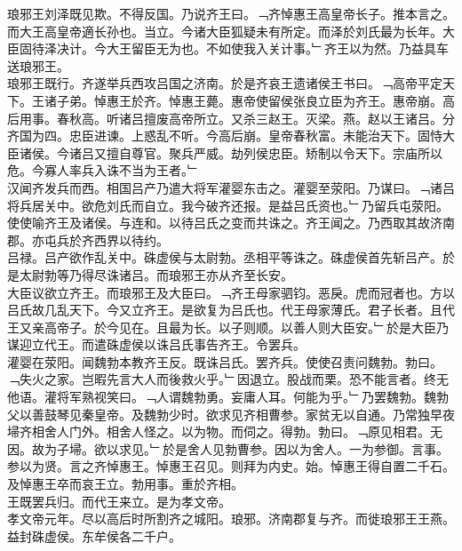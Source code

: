 \documentclass{zhvt-classic}
\begin{document}
\hspace*{2em}琅邪王刘泽既见欺。不得反国。乃说齐王曰。﹁齐悼惠王高皇帝长子。推本言之。而大王高皇帝適长孙也。当立。今诸大臣狐疑未有所定。而泽於刘氏最为长年。大臣固待泽决计。今大王留臣无为也。不如使我入关计事。﹂齐王以为然。乃益具车送琅邪王。\\
\hspace*{2em}琅邪王既行。齐遂举兵西攻吕国之济南。於是齐哀王遗诸侯王书曰。﹁高帝平定天下。王诸子弟。悼惠王於齐。悼惠王薨。惠帝使留侯张良立臣为齐王。惠帝崩。高后用事。春秋高。听诸吕擅废高帝所立。又杀三赵王。灭梁。燕。赵以王诸吕。分齐国为四。忠臣进谏。上惑乱不听。今高后崩。皇帝春秋富。未能治天下。固恃大臣诸侯。今诸吕又擅自尊官。聚兵严威。劫列侯忠臣。矫制以令天下。宗庙所以危。今寡人率兵入诛不当为王者。﹂\\
\hspace*{2em}汉闻齐发兵而西。相国吕产乃遣大将军灌婴东击之。灌婴至荥阳。乃谋曰。﹁诸吕将兵居关中。欲危刘氏而自立。我今破齐还报。是益吕氏资也。﹂乃留兵屯荥阳。使使喻齐王及诸侯。与连和。以待吕氏之变而共诛之。齐王闻之。乃西取其故济南郡。亦屯兵於齐西界以待约。\\
\hspace*{2em}吕禄。吕产欲作乱关中。硃虚侯与太尉勃。丞相平等诛之。硃虚侯首先斩吕产。於是太尉勃等乃得尽诛诸吕。而琅邪王亦从齐至长安。\\
\hspace*{2em}大臣议欲立齐王。而琅邪王及大臣曰。﹁齐王母家驷钧。恶戾。虎而冠者也。方以吕氏故几乱天下。今又立齐王。是欲复为吕氏也。代王母家薄氏。君子长者。且代王又亲高帝子。於今见在。且最为长。以子则顺。以善人则大臣安。﹂於是大臣乃谋迎立代王。而遣硃虚侯以诛吕氏事告齐王。令罢兵。\\
\hspace*{2em}灌婴在荥阳。闻魏勃本教齐王反。既诛吕氏。罢齐兵。使使召责问魏勃。勃曰。﹁失火之家。岂暇先言大人而後救火乎。﹂因退立。股战而栗。恐不能言者。终无他语。灌将军熟视笑曰。﹁人谓魏勃勇。妄庸人耳。何能为乎。﹂乃罢魏勃。魏勃父以善鼓琴见秦皇帝。及魏勃少时。欲求见齐相曹参。家贫无以自通。乃常独早夜埽齐相舍人门外。相舍人怪之。以为物。而伺之。得勃。勃曰。﹁原见相君。无因。故为子埽。欲以求见。﹂於是舍人见勃曹参。因以为舍人。一为参御。言事。参以为贤。言之齐悼惠王。悼惠王召见。则拜为内史。始。悼惠王得自置二千石。及悼惠王卒而哀王立。勃用事。重於齐相。\\
\hspace*{2em}王既罢兵归。而代王来立。是为孝文帝。\\
\hspace*{2em}孝文帝元年。尽以高后时所割齐之城阳。琅邪。济南郡复与齐。而徙琅邪王王燕。益封硃虚侯。东牟侯各二千户。\\
\end{document}
